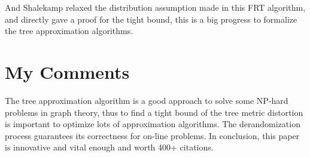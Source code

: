 \documentclass[11pt,twoside, onecolumn]{IEEEtran}
\begin{document}
And Shalekamp relaxed the distribution assumption made in this FRT algorithm, and directly gave a proof
for the tight bound, this is a big progress to formalize the tree approximation algorithms\cite{FRT}.

\section{My Comments}
The tree approximation algorithm is a good approach to solve some NP-hard problems in graph theory,
thus to find a tight bound of the tree metric distortion is important to optimize lots of approximation 
algorithms. The derandomization process guarantees its correctness for on-line problems. In conclusion,
this paper is innovative and vital enough and worth 400+ citations.


\end{document}
